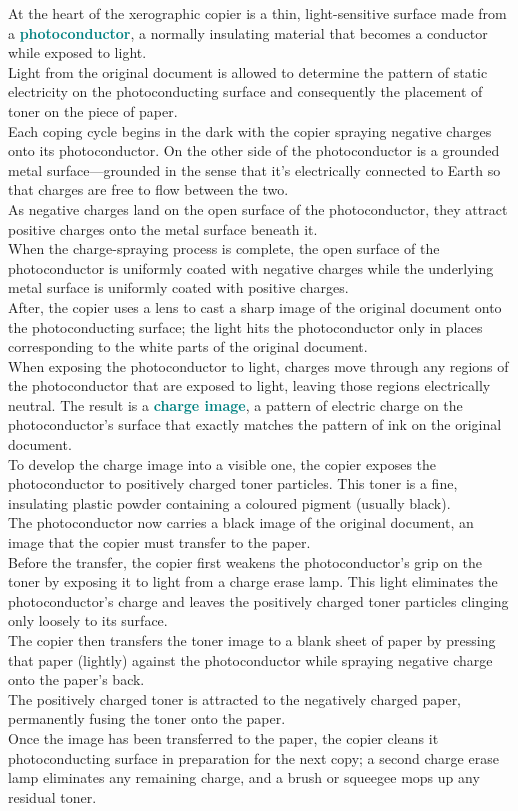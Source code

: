 \documentclass[12pt]{article}
\theoremstyle{definition}
\newcommand{\defnterm}[1]{\textbf{\textcolor{teal}{#1}}\index{#1}}
\begin{document}
At the heart of the xerographic copier is a thin, light-sensitive surface made from a \defnterm{photoconductor}, a normally insulating material that becomes a conductor while exposed to light. \\
Light from the original document is allowed to determine the pattern of static electricity on the photoconducting surface and consequently the placement of toner on the piece of paper. \\

Each coping cycle begins in the dark with the copier spraying negative charges onto its photoconductor.
On the other side of the photoconductor is a grounded metal surface---grounded in the sense that it's electrically connected to Earth so that charges are free to flow between the two. \\
As negative charges land on the open surface of the photoconductor, they attract positive charges onto the metal surface beneath it. \\
When the charge-spraying process is complete, the open surface of the photoconductor is uniformly coated with negative charges while the underlying metal surface is uniformly coated with positive charges. \\
After, the copier uses a lens to cast a sharp image of the original document onto the photoconducting surface;
the light hits the photoconductor only in places corresponding to the white parts of the original document. \\
When exposing the photoconductor to light, charges move through any regions of the photoconductor that are exposed to light, leaving those regions electrically neutral.
The result is a \defnterm{charge image}, a pattern of electric charge on the photoconductor's surface that exactly matches the pattern of ink on the original document. \\

To develop the charge image into a visible one, the copier exposes the photoconductor to positively charged toner particles.
This toner is a fine, insulating plastic powder containing a coloured pigment (usually black). \\

The photoconductor now carries a black image of the original document, an image that the copier must transfer to the paper. \\
Before the transfer, the copier first weakens the photoconductor's grip on the toner by exposing it to light from a charge erase lamp.
This light eliminates the photoconductor's charge and leaves the positively charged toner particles clinging only loosely to its surface. \\
The copier then transfers the toner image to a blank sheet of paper by pressing that paper (lightly) against the photoconductor while spraying negative charge onto the paper's back. \\
The positively charged toner is attracted to the negatively charged paper, permanently fusing the toner onto the paper. \\
Once the image has been transferred to the paper, the copier cleans it photoconducting surface in preparation for the next copy; a second charge erase lamp eliminates any remaining charge, and a brush or squeegee mops up any residual toner.
\end{document}
